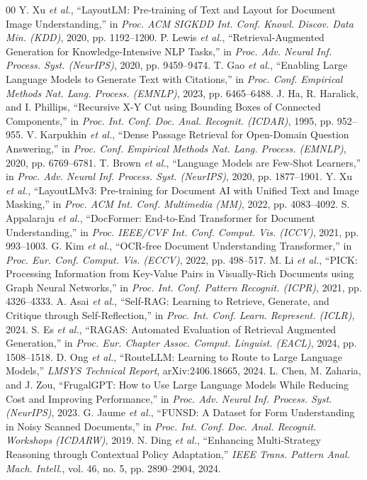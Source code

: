 \documentclass[conference]{IEEEtran}
\begin{document}
\begin{thebibliography}{00}
 Y. Xu \textit{et al.}, ``LayoutLM: Pre-training of Text and Layout for Document Image Understanding,'' in \textit{Proc. ACM SIGKDD Int. Conf. Knowl. Discov. Data Min. (KDD)}, 2020, pp. 1192--1200.
 P. Lewis \textit{et al.}, ``Retrieval-Augmented Generation for Knowledge-Intensive NLP Tasks,'' in \textit{Proc. Adv. Neural Inf. Process. Syst. (NeurIPS)}, 2020, pp. 9459--9474.
 T. Gao \textit{et al.}, ``Enabling Large Language Models to Generate Text with Citations,'' in \textit{Proc. Conf. Empirical Methods Nat. Lang. Process. (EMNLP)}, 2023, pp. 6465--6488.
 J. Ha, R. Haralick, and I. Phillips, ``Recursive X-Y Cut using Bounding Boxes of Connected Components,'' in \textit{Proc. Int. Conf. Doc. Anal. Recognit. (ICDAR)}, 1995, pp. 952--955.
 V. Karpukhin \textit{et al.}, ``Dense Passage Retrieval for Open-Domain Question Answering,'' in \textit{Proc. Conf. Empirical Methods Nat. Lang. Process. (EMNLP)}, 2020, pp. 6769--6781.
 T. Brown \textit{et al.}, ``Language Models are Few-Shot Learners,'' in \textit{Proc. Adv. Neural Inf. Process. Syst. (NeurIPS)}, 2020, pp. 1877--1901.
 Y. Xu \textit{et al.}, ``LayoutLMv3: Pre-training for Document AI with Unified Text and Image Masking,'' in \textit{Proc. ACM Int. Conf. Multimedia (MM)}, 2022, pp. 4083--4092.
 S. Appalaraju \textit{et al.}, ``DocFormer: End-to-End Transformer for Document Understanding,'' in \textit{Proc. IEEE/CVF Int. Conf. Comput. Vis. (ICCV)}, 2021, pp. 993--1003.
 G. Kim \textit{et al.}, ``OCR-free Document Understanding Transformer,'' in \textit{Proc. Eur. Conf. Comput. Vis. (ECCV)}, 2022, pp. 498--517.
 M. Li \textit{et al.}, ``PICK: Processing Information from Key-Value Pairs in Visually-Rich Documents using Graph Neural Networks,'' in \textit{Proc. Int. Conf. Pattern Recognit. (ICPR)}, 2021, pp. 4326--4333.
 A. Asai \textit{et al.}, ``Self-RAG: Learning to Retrieve, Generate, and Critique through Self-Reflection,'' in \textit{Proc. Int. Conf. Learn. Represent. (ICLR)}, 2024.
 S. Es \textit{et al.}, ``RAGAS: Automated Evaluation of Retrieval Augmented Generation,'' in \textit{Proc. Eur. Chapter Assoc. Comput. Linguist. (EACL)}, 2024, pp. 1508--1518.
 D. Ong \textit{et al.}, ``RouteLLM: Learning to Route to Large Language Models,'' \textit{LMSYS Technical Report}, arXiv:2406.18665, 2024.
 L. Chen, M. Zaharia, and J. Zou, ``FrugalGPT: How to Use Large Language Models While Reducing Cost and Improving Performance,'' in \textit{Proc. Adv. Neural Inf. Process. Syst. (NeurIPS)}, 2023.
 G. Jaume \textit{et al.}, ``FUNSD: A Dataset for Form Understanding in Noisy Scanned Documents,'' in \textit{Proc. Int. Conf. Doc. Anal. Recognit. Workshops (ICDARW)}, 2019.
 N. Ding \textit{et al.}, ``Enhancing Multi-Strategy Reasoning through Contextual Policy Adaptation,'' \textit{IEEE Trans. Pattern Anal. Mach. Intell.}, vol. 46, no. 5, pp. 2890--2904, 2024.
\end{thebibliography}
\end{document}
